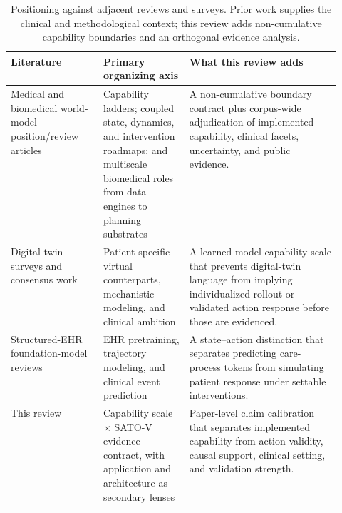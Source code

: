 \begin{table}[t]
\caption{Positioning against adjacent reviews and surveys. Prior work supplies the clinical and methodological context; this review adds non-cumulative capability boundaries and an orthogonal evidence analysis.}
\label{tab:review-positioning}
\centering
\small
\begin{tabularx}{\linewidth}{@{}p{0.28\linewidth}p{0.26\linewidth}X@{}}
\toprule
\textbf{Literature} & \textbf{Primary organizing axis} & \textbf{What this review adds} \\
\midrule
Medical and biomedical world-model position/review articles \citep{Qazi2025BeyondGenerativeAI,Saeed2026MedicalWorldModel,Liu2026MedicalWorldModelsReview,Wang2026TowardsBiomedicalWorldModels} & Capability ladders; coupled state, dynamics, and intervention roadmaps; and multiscale biomedical roles from data engines to planning substrates & A non-cumulative boundary contract plus corpus-wide adjudication of implemented capability, clinical facets, uncertainty, and public evidence. \\
Digital-twin surveys and consensus work \citep{Iqbal2025consensusstatementon,Katsoulakis2024Digitaltwinshealth,Ghatti2023DigitalTwinsHealthcare} & Patient-specific virtual counterparts, mechanistic modeling, and clinical ambition & A learned-model capability scale that prevents digital-twin language from implying individualized rollout or validated action response before those are evidenced. \\
Structured-EHR foundation-model reviews \citep{Guo2026Systematicreviewfoundation} & EHR pretraining, trajectory modeling, and clinical event prediction & A state--action distinction that separates predicting care-process tokens from simulating patient response under settable interventions. \\
This review & Capability scale $\times$ SATO-V evidence contract, with application and architecture as secondary lenses & Paper-level claim calibration that separates implemented capability from action validity, causal support, clinical setting, and validation strength. \\
\bottomrule
\end{tabularx}
\end{table}
